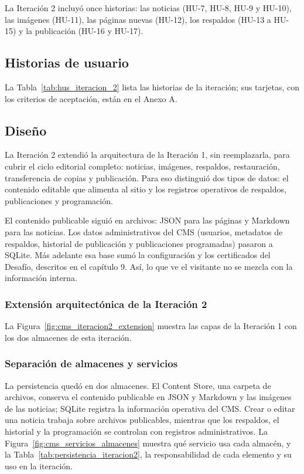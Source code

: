 La Iteración 2 incluyó once historias: las noticias (HU-7, HU-8, HU-9 y HU-10), las imágenes (HU-11), las páginas nuevas (HU-12), los respaldos (HU-13 a HU-15) y la publicación (HU-16 y HU-17).

\subsection{Historias de usuario}

La Tabla~\ref{tab:hus_iteracion_2} lista las historias de la iteración; sus tarjetas, con los criterios de aceptación, están en el Anexo A.




\subsection{Diseño}

La Iteración 2 extendió la arquitectura de la Iteración 1, sin reemplazarla, para cubrir el ciclo editorial completo: noticias, imágenes, respaldos, restauración, transferencia de copias y publicación. Para eso distinguió dos tipos de datos: el contenido editable que alimenta al sitio y los registros operativos de respaldos, publicaciones y programación.

El contenido publicable siguió en archivos: JSON para las páginas y Markdown para las noticias. Los datos administrativos del CMS (usuarios, metadatos de respaldos, historial de publicación y publicaciones programadas) pasaron a SQLite. Más adelante esa base sumó la configuración y los certificados del Desafío, descritos en el capítulo 9. Así, lo que ve el visitante no se mezcla con la información interna.

\subsubsection{Extensión arquitectónica de la Iteración 2}

La Figura~\ref{fig:cms_iteracion2_extension} muestra las capas de la Iteración 1 con los dos almacenes de esta iteración.



\subsubsection{Separación de almacenes y servicios}

La persistencia quedó en dos almacenes. El Content Store, una carpeta de archivos, conserva el contenido publicable en JSON y Markdown y las imágenes de las noticias; SQLite registra la información operativa del CMS. Crear o editar una noticia trabaja sobre archivos publicables, mientras que los respaldos, el historial y la programación se controlan con registros administrativos. La Figura~\ref{fig:cms_servicios_almacenes} muestra qué servicio usa cada almacén, y la Tabla~\ref{tab:persistencia_iteracion2}, la responsabilidad de cada elemento y su uso en la iteración.

